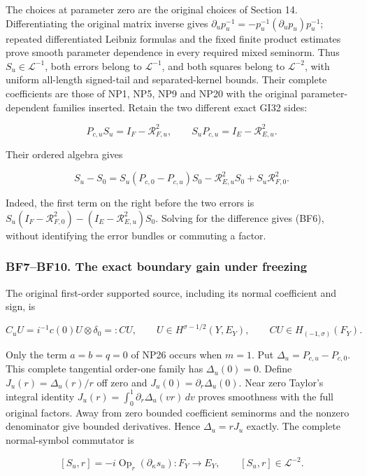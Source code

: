 \documentclass[
  11pt,
]{article}
\begin{document}
The choices at parameter zero are the original choices of Section 14.
Differentiating the original matrix inverse gives
\(\partial_u p_u^{-1}=-p_u^{-1}(\partial_u p_u)p_u^{-1}\); repeated
differentiated Leibniz formulas and the fixed finite product estimates
prove smooth parameter dependence in every required mixed seminorm. Thus
\(S_u\in\mathcal L^{-1}\), both errors belong to \(\mathcal L^{-1}\),
and both squares belong to \(\mathcal L^{-2}\), with uniform all-length
signed-tail and separated-kernel bounds. Their complete coefficients are
those of NP1, NP5, NP9 and NP20 with the original parameter-dependent
families inserted. Retain the two different exact GI32 sides:

\[
 P_{c,u}S_u=I_F-\mathcal R_{F,u}^2,\qquad
 S_uP_{c,u}=I_E-\mathcal R_{E,u}^2.
 \tag{BF5}
\]

Their ordered algebra gives

\[
 \boxed{\displaystyle
 S_u-S_0=S_u(P_{c,0}-P_{c,u})S_0
           -\mathcal R_{E,u}^2S_0
           +S_u\mathcal R_{F,0}^2.}
 \tag{BF6}
\]

Indeed, the first term on the right before the two errors is
\(S_u(I_F-\mathcal R_{F,0}^2)-(I_E-\mathcal R_{E,u}^2)S_0\). Solving for
the difference gives (BF6), without identifying the error bundles or
commuting a factor.

\subsubsection{BF7--BF10. The exact boundary gain under
freezing}\label{bf7bf10.-the-exact-boundary-gain-under-freezing}

The original first-order supported source, including its normal
coefficient and sign, is

\[
 C_uU=i^{-1}c(0)U\otimes\delta_0=:CU,
 \qquad U\in H^{\sigma-1/2}(Y,E_Y),
 \qquad CU\in H_{(-1,\sigma)}(F_Y).
 \tag{BF7}
\]

Only the term \(a=b=q=0\) of NP26 occurs when \(m=1\). Put
\(\Delta_u=P_{c,u}-P_{c,0}\). This complete tangential order-one family
has \(\Delta_u(0)=0\). Define \(J_u(r)=\Delta_u(r)/r\) off zero and
\(J_u(0)=\partial_r\Delta_u(0)\). Near zero Taylor's integral identity
\(J_u(r)=\int_0^1\partial_r\Delta_u(vr)\,dv\) proves smoothness with the
full original factors. Away from zero bounded coefficient seminorms and
the nonzero denominator give bounded derivatives. Hence
\(\Delta_u=rJ_u\) exactly. The complete normal-symbol commutator is

\[
 [S_u,r]=-i\operatorname{Op}_r(\partial_\kappa s_u):F_Y\to E_Y,
 \qquad [S_u,r]\in\mathcal L^{-2}.
 \tag{BF8}
\]
\end{document}
